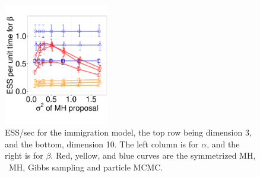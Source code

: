 {\begin{figure}
\begin{minipage}[hp]{0.99\linewidth}
    \includegraphics [width=0.41\textwidth, angle=0]{figs/q_10_beta.pdf}
    \vspace{-0.1 in}
  \end{minipage}
    \caption{ESS/sec for the immigration model, the top row being dimension 3, and the bottom,
      dimension 10. The left column is for $\alpha$, and the 
    right is for $\beta$. Red, yellow, and blue curves are the symmetrized MH,
  \naive\ MH, Gibbs sampling and particle MCMC.}
     \label{fig:ESS_Q_D10}
  \end{figure}
  \begin{figure}[H]
  \centering


\end{figure}}
